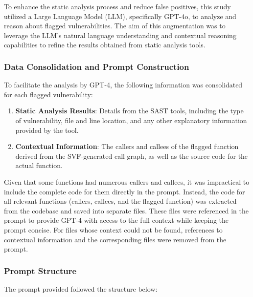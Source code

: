 To enhance the static analysis process and reduce false positives, this study utilized a Large Language Model (LLM), specifically GPT-4o, to analyze and reason about flagged vulnerabilities. The aim of this augmentation was to leverage the LLM's natural language understanding and contextual reasoning capabilities to refine the results obtained from static analysis tools.

\subsubsection{Data Consolidation and Prompt Construction}
To facilitate the analysis by GPT-4, the following information was consolidated for each flagged vulnerability:
\begin{enumerate}
    \item \textbf{Static Analysis Results}: Details from the SAST tools, including the type of vulnerability, file and line location, and any other explanatory information provided by the tool.
    \item \textbf{Contextual Information}: The callers and callees of the flagged function derived from the SVF-generated call graph, as well as the source code for the actual function.
\end{enumerate}

Given that some functions had numerous callers and callees, it was impractical to include the complete code for them directly in the prompt. Instead, the code for all relevant functions (callers, callees, and the flagged function) was extracted from the codebase and saved into separate files. These files were referenced in the prompt to provide GPT-4 with access to the full context while keeping the prompt concise. For files whose context could not be found, references to contextual information and the corresponding files were removed from the prompt.

\subsubsection{Prompt Structure}
The prompt provided followed the structure below:

